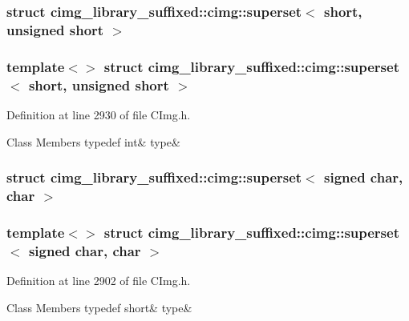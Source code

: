 \subsubsection{struct cimg\+\_\+library\+\_\+suffixed\+:\+:cimg\+:\+:superset$<$ short, unsigned short $>$}
\subsubsection*{template$<$$>$\newline
struct cimg\+\_\+library\+\_\+suffixed\+::cimg\+::superset$<$ short, unsigned short $>$}



Definition at line 2930 of file C\+Img.\+h.

\begin{DoxyFields}{Class Members}
\mbox{\label{namespacecimg__library__suffixed_1_1cimg_a272ac1c96b01cb17818576b588ec7075}} 
typedef int&
type&
\\
\hline

\end{DoxyFields}
\label{structcimg__library__suffixed_1_1cimg_1_1superset_3_01signed_01char_00_01char_01_4}
\subsubsection{struct cimg\+\_\+library\+\_\+suffixed\+:\+:cimg\+:\+:superset$<$ signed char, char $>$}
\subsubsection*{template$<$$>$\newline
struct cimg\+\_\+library\+\_\+suffixed\+::cimg\+::superset$<$ signed char, char $>$}



Definition at line 2902 of file C\+Img.\+h.

\begin{DoxyFields}{Class Members}
\mbox{\label{namespacecimg__library__suffixed_1_1cimg_ab5d01c56fd997d6e68eccae01ded7ba8}} 
typedef short&
type&
\\
\hline

\end{DoxyFields}
\label{structcimg__library__suffixed_1_1cimg_1_1superset_3_01signed_01char_00_01cimg__int64_01_4}
